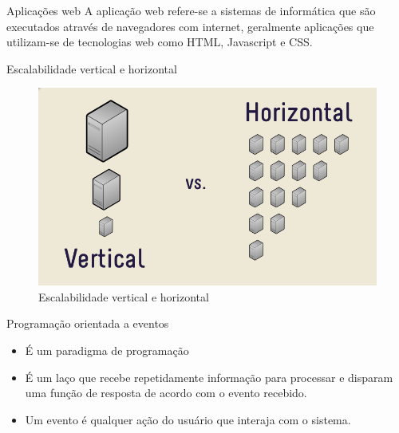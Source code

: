 \documentclass{beamer}
\newlength{\wideitemsep}
\let\olditem\item
\renewcommand{\item}{\setlength{\itemsep}{\wideitemsep}\olditem}
\begin{document}
\begin{frame}{Aplicações web}
A aplicação web refere-se a sistemas de informática que são executados através de navegadores com internet, geralmente aplicações que utilizam-se de tecnologias web como HTML, Javascript e CSS.
\end{frame}

%        
%        

\begin{frame}{Escalabilidade vertical e horizontal}
  \begin{figure}[htb]
    \centering
    \includegraphics[scale=0.30]{../images/scal_vh.png}
    \caption{ Escalabilidade vertical e horizontal}
    \label{fig: scal_vh}
    \end{figure}
\end{frame}

\begin{frame}{Programação orientada a eventos}
    \begin{itemize}
        \item É um paradigma de programação  
        
         \item É um laço que recebe repetidamente informação para processar e disparam uma função de resposta de acordo com o evento recebido.
         
        \item Um evento é qualquer ação do usuário que interaja com o sistema.
        \end{itemize}
\end{frame}
\end{document}

